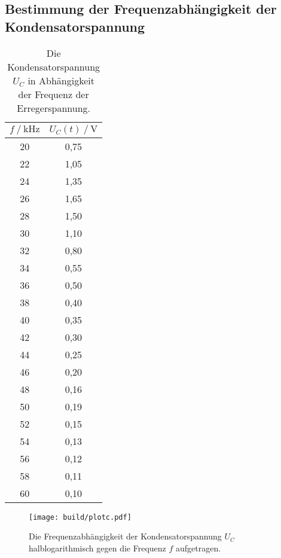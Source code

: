 \subsection{Bestimmung der Frequenzabhängigkeit der Kondensatorspannung}
\label{Kondensatorspannung}

\begin{table}[H]
  \centering
  \caption{Die Kondensatorspannung $U_C$ in Abhängigkeit der Frequenz der Erregerspannung.}
  \begin{tabular}{cc}
    \toprule
    {$f \mathbin{/} \unit{\kilo\hertz}$} &
    {$U_C(t) \mathbin{/} \unit{\volt}$} \\
    \midrule
    20 & 0,75 \\
    22 & 1,05 \\
    24 & 1,35 \\
    26 & 1,65 \\
    28 & 1,50 \\
    30 & 1,10 \\
    32 & 0,80 \\
    34 & 0,55 \\
    36 & 0,50 \\
    38 & 0,40 \\
    40 & 0,35 \\
    42 & 0,30 \\
    44 & 0,25 \\
    46 & 0,20 \\
    48 & 0,16 \\
    50 & 0,19 \\
    52 & 0,15 \\
    54 & 0,13 \\
    56 & 0,12 \\
    58 & 0,11 \\
    60 & 0,10 \\

    \bottomrule
  \end{tabular}
  \label{tab:Tabelle1}
\end{table}



\begin{figure}
  \centering
  \texttt{[image: build/plotc.pdf]}
  \caption{Die Frequenzabhängigkeit der Kondensatorspannung $U_C$ halblogarithmisch gegen die Frequenz $f$ aufgetragen.}
  \label{fig:plotc}
\end{figure}




